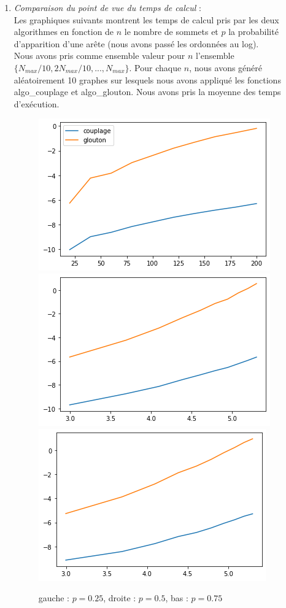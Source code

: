 \documentclass[12pt]{article}
\begin{document}
        \begin{enumerate}
            \item \textit{Comparaison du point de vue du temps de calcul} : \\
                Les graphiques suivants montrent les temps de calcul pris par les deux algorithmes en fonction de $n$ le nombre de sommets et $p$ la probabilité d'apparition d'une arête (nous avons passé les ordonnées au log). \\
                Nous avons pris comme ensemble valeur pour $n$ l'ensemble $\{N_{max}/10, 2N_{max}/10,..., N_{max}\}$. Pour chaque $n$, nous avons généré aléatoirement 10 graphes sur lesquels nous avons appliqué les fonctions algo\_couplage et algo\_glouton. Nous avons pris la moyenne des temps d'exécution. \\

                \begin{figure}[h]
                    \caption{gauche : $p=0.25$, droite : $p=0.5$, bas : $p=0.75$}
                    \includegraphics[scale=0.5]{figures/tps_exec_couglou25.png}
                    \includegraphics[scale=0.5]{figures/tps_exec_couglou5.png}
                    \includegraphics[scale=0.5]{figures/tps_exec_couglou75.png}
                    \centering
                \end{figure}


\end{enumerate}
\end{document}

